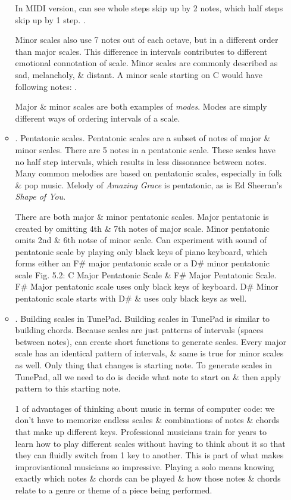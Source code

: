 \documentclass{article}
\begin{document}
\begin{itemize}
\begin{itemize}
		In MIDI version, can see whole steps skip up by 2 notes, which half steps skip up by 1 step. {}.
		
		Minor scales also use 7 notes out of each octave, but in a different order than major scales. This difference in intervals contributes to different emotional connotation of scale. Minor scales are commonly described as sad, melancholy, \& distant. A minor scale starting on C would have following notes: {}.
		
		Major \& minor scales are both examples of {\it modes}. Modes are simply different ways of ordering intervals of a scale.
		\item {. Pentatonic scales.} Pentatonic scales are a subset of notes of major \& minor scales. There are 5 notes in a pentatonic scale. These scales have no half step intervals, which results in less dissonance between notes. Many common melodies are based on pentatonic scales, especially in folk \& pop music. Melody of {\it Amazing Grace} is pentatonic, as is {\sc Ed Sheeran}'s {\it Shape of You}.
		
		There are both major \& minor pentatonic scales. Major pentatonic is created by omitting 4th \& 7th notes of major scale. Minor pentatonic omits 2nd \& 6th notse of minor scale. Can experiment with sound of pentatonic scale by playing only black keys of piano keyboard, which forms either an F\# major pentatonic scale or a D\# minor pentatonic scale {\sf Fig. 5.2: C Major Pentatonic Scale \& F\# Major Pentatonic Scale.} F\# Major pentatonic scale uses only black keys of keyboard. D\# Minor pentatonic scale starts with D\# \& uses only black keys as well.
		\item {. Building scales in TunePad.} Building scales in TunePad is similar to building chords. Because scales are just patterns of intervals (spaces between notes), can create short functions to generate scales. Every major scale has an identical pattern of intervals, \& same is true for minor scales as well. Only thing that changes is starting note. To generate scales in TunePad, all we need to do is decide what note to start on \& then apply pattern to this starting note.
		
		1 of advantages of thinking about music in terms of computer code: we don't have to memorize endless scales \& combinations of notes \& chords that make up different keys. Professional musicians train for years to learn how to play different scales without having to think about it so that they can fluidly switch from 1 key to another. This is part of what makes improvisational musicians so impressive. Playing a solo means knowing exactly which notes \& chords can be played \& how those notes \& chords relate to a genre or theme of a piece being performed.
		

\end{itemize}
\end{itemize}
\end{document}
